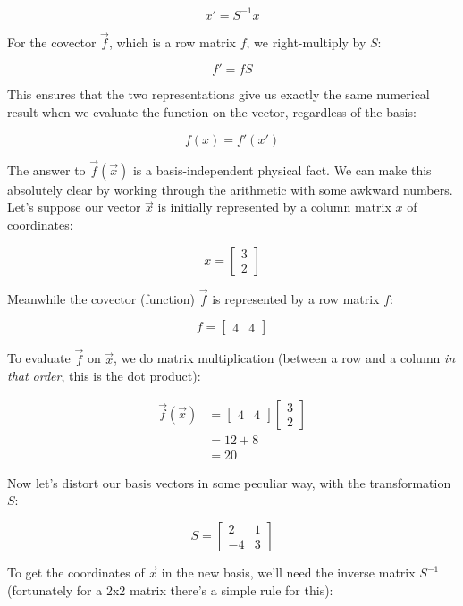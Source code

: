 $$
x' = S^{-1} x
$$

For the covector $\vec{f}$, which is a row matrix $f$, we right-multiply by $S$:

$$
f' = f S
$$

This ensures that the two representations give us exactly the same numerical result when we evaluate the function on the vector, regardless of the basis:

$$
f(x) = f'(x')
$$

The answer to $\vec{f}(\vec{x})$ is a basis-independent physical fact. We can make this absolutely clear by working through the arithmetic with some awkward numbers. Let's suppose our vector $\vec{x}$ is initially represented by a column matrix $x$ of coordinates:

$$
x = \begin{bmatrix} 3 \\ 2 \end{bmatrix}
$$

Meanwhile the covector (function) $\vec{f}$ is represented by a row matrix $f$:

$$
f = \begin{bmatrix} 4 & 4 \end{bmatrix}
$$

To evaluate $\vec{f}$ on $\vec{x}$, we do matrix multiplication (between a row and a column \textit{in that order}, this is the dot product):

\begin{equation}
\begin{split}
    \vec{f}(\vec{x}) &= \begin{bmatrix} 4 & 4 \end{bmatrix} \begin{bmatrix} 3 \\ 2 \end{bmatrix} \\
    &= 12 + 8 \\
    &= 20
\end{split}
\end{equation}

Now let's distort our basis vectors in some peculiar way, with the transformation $S$:

$$
S = \begin{bmatrix}
    2 & 1 \\
    -4 & 3
\end{bmatrix}
$$

To get the coordinates of $\vec{x}$ in the new basis, we'll need the inverse matrix $S^{-1}$ (fortunately for a 2x2 matrix there's a simple rule for this):

